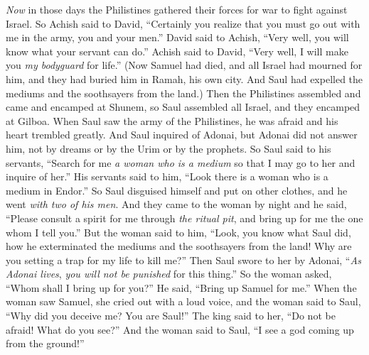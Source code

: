 \begin{biblechapter} %
\verse \textit{Now} in those days the Philistines gathered their forces for war to fight against Israel. So Achish said to David, “Certainly you realize that you must go out with me in the army, you and your men.”
\verse David said to Achish, “Very well, you will know what your servant can do.” Achish said to David, “Very well, I will make you \textit{my bodyguard} for life.”
 (Now Samuel had died, and all Israel had mourned for him, and they had buried him in Ramah, his own city. And Saul had expelled the mediums and the soothsayers from the land.)
\verse Then the Philistines assembled and came and encamped at Shunem, so Saul assembled all Israel, and they encamped at Gilboa.
\verse When Saul saw the army of the Philistines, he was afraid and his heart trembled greatly.
\verse And Saul inquired of Adonai, but Adonai did not answer him, not by dreams or by the Urim or by the prophets.
\verse So Saul said to his servants, “Search for me \textit{a woman who is a medium} so that I may go to her and inquire of her.” His servants said to him, “Look there is a woman who is a medium in Endor.”
\verse So Saul disguised himself and put on other clothes, and he went \textit{with two of his men}. And they came to the woman by night and he said, “Please consult a spirit for me through \textit{the ritual pit}, and bring up for me the one whom I tell you.”
\verse But the woman said to him, “Look, you know what Saul did, how he exterminated the mediums and the soothsayers from the land! Why are you setting a trap for my life to kill me?”
\verse Then Saul swore to her by Adonai, “\textit{As Adonai lives}, \textit{you will not be punished} for this thing.”
\verse So the woman asked, “Whom shall I bring up for you?” He said, “Bring up Samuel for me.”
\verse When the woman saw Samuel, she cried out with a loud voice, and the woman said to Saul, “Why did you deceive me? You are Saul!”
\verse The king said to her, “Do not be afraid! What do you see?” And the woman said to Saul, “I see a god coming up from the ground!”

\end{biblechapter}
